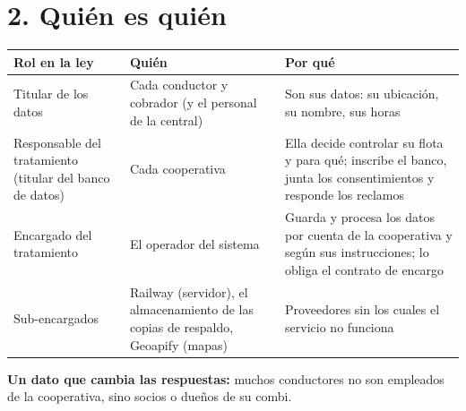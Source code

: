 \documentclass[10.5pt,a4paper]{article}
\begin{document}
\section{2. Quién es quién}
\begin{tabularx}{\linewidth}{>{\raggedright}p{4.2cm}>{\raggedright}p{3.6cm}X}
\toprule
\textbf{Rol en la ley} & \textbf{Quién} & \textbf{Por qué}\\\midrule
Titular de los datos & Cada conductor y cobrador (y el personal de la central) & Son sus datos: su ubicación, su nombre, sus horas\\
Responsable del tratamiento (titular del banco de datos) & Cada cooperativa & Ella decide controlar su flota y para qué; inscribe el banco, junta los consentimientos y responde los reclamos\\
Encargado del tratamiento & El operador del sistema & Guarda y procesa los datos por cuenta de la cooperativa y según sus instrucciones; lo obliga el contrato de encargo\\
Sub-encargados & Railway (servidor), el almacenamiento de las copias de respaldo, Geoapify (mapas) & Proveedores sin los cuales el servicio no funciona\\
\bottomrule
\end{tabularx}

\textbf{Un dato que cambia las respuestas:} muchos conductores no son
empleados de la cooperativa, sino socios o dueños de su combi.
\end{document}
